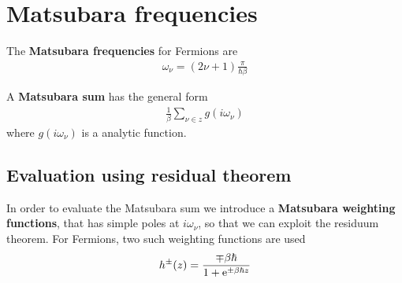 \documentclass[11pt,a4paper]{report}
\begin{document}
\chapter{Matsubara frequencies}
\label{app:matsubarafreq}

The \textbf{Matsubara frequencies} for Fermions are
\begin{eqnarray*}
\omega_\nu=(2\nu+1)\frac{\pi}{\hbar\beta}
\end{eqnarray*}

A \textbf{Matsubara sum}
 has the general form
\begin{eqnarray*}
\frac{1}{\beta}\sum_{\nu\in z} g(i\omega_\nu)
\end{eqnarray*}
where $g(i\omega_\nu)$ is a analytic function.

\section{Evaluation using residual theorem}
In order to evaluate the Matsubara sum we introduce a
\textbf{Matsubara weighting functions}, that has simple poles at $i\omega_\nu$, so that we can
exploit the residuum theorem. For Fermions, two such weighting
functions are used
\begin{eqnarray}
h^\pm(z)=\frac{\mp\beta\hbar}{1+\mathrm{e}^{\pm\beta\hbar z}}
\end{eqnarray}
\end{document}
